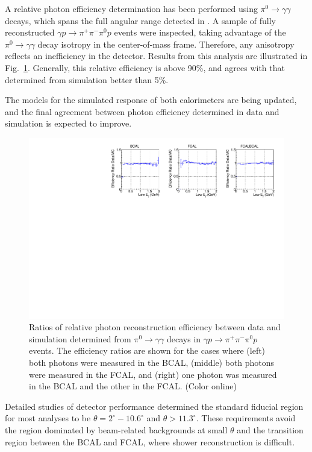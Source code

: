 A relative photon efficiency determination has been performed using $\pi^0\to\gamma\gamma$ decays, which spans the full angular range detected in \gx{}.  A sample of fully reconstructed $\gamma p \to  \pi^+\pi^-\pi^0 p$ events were inspected, taking advantage of the $\pi^0\to\gamma\gamma$ decay isotropy in the center-of-mass frame.  Therefore, any anisotropy reflects an inefficiency in the detector. Results from this analysis are illustrated in Fig.~\ref{fig:bcalpi0photoneff}. Generally, this relative efficiency is above 90\%, and agrees with that determined from simulation better than 5\%.  

The models for the simulated response of both calorimeters are being updated, and the final agreement between photon efficiency determined in data and simulation is expected to improve.

\begin{figure}[tbp]
\begin{center}
\includegraphics[width=\textwidth]{figures/plot_CostheEff_NIM_jun19.pdf}
\caption{\label{fig:bcalpi0photoneff}
Ratios of relative photon reconstruction efficiency between data and simulation determined from $\pi^0\to\gamma \gamma$ decays in $\gamma p \to  \pi^+\pi^-\pi^0 p$ events.  The efficiency ratios are shown for the cases where (left) both photons were measured in the BCAL, (middle) both photons were measured in the FCAL, and (right) one photon was measured in the BCAL and the other in the FCAL.
 (Color online)}
\end{center}
\end{figure}


Detailed studies of detector performance determined the standard fiducial region for most analyses to be $\theta = 2^\circ - 10.6^\circ$ and $\theta > 11.3^\circ$.  These requirements avoid the region dominated by beam-related backgrounds at small $\theta$ and the transition region between the BCAL and FCAL, where shower reconstruction is difficult.

